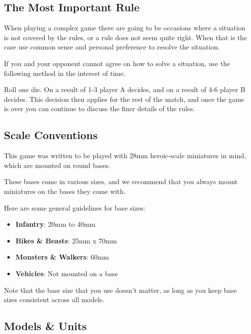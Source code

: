 \documentclass[9pt, a4paper, bookmarks=false]{extarticle}            %
\begin{document}
\begin{multicols}{2}

\subsection{The Most Important Rule}

When playing a complex game there are going to be occasions where a situation is not covered by the rules, or a rule does not seem quite right. When that is the case use common sense and personal preference to resolve the situation.

If you and your opponent cannot agree on how to solve a situation, use the following method in the interest of time.

Roll one die. On a result of 1-3 player A decides, and on a result of 4-6 player B decides. This decision then applies for the rest of the match, and once the game is over you can continue to discuss the finer details of the rules.

\subsection{Scale Conventions}

This game was written to be played with 28mm heroic-scale miniatures in mind, which are mounted on round bases.

These bases come in various sizes, and we recommend that you always mount miniatures on the bases they come with.

Here are some general guidelines for base sizes:

\begin{itemize}
  \item \textbf{Infantry}: 20mm to 40mm
  \item \textbf{Bikes \& Beasts}: 25mm x 70mm
  \item \textbf{Monsters \& Walkers}: 60mm
  \item \textbf{Vehicles}: Not mounted on a base
\end{itemize}

Note that the base size that you use doesn’t matter, as long as you keep base sizes consistent across all models.

\subsection{Models \& Units}


\end{multicols}
\end{document}
